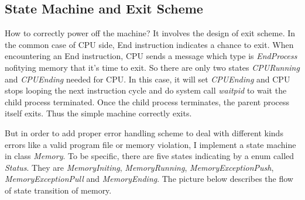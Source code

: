 \documentclass[a4paper]{report}
\begin{document}
\subsection*{State Machine and Exit Scheme}
How to correctly power off the machine? It involves the design of exit scheme. In the common case of CPU side, End instruction indicates a chance to exit. When encountering an End instruction, CPU sends a message which type is \textit{\color{blue} EndProcess} nofitying memory that it's time to exit. So there are only two states \textit{\color{blue} CPURunning} and \textit{\color{blue} CPUEnding} needed for CPU. In this case, it will set \textit{\color{blue} CPUEnding} and CPU stops looping the next instruction cycle and do system call \textit{\color{blue} waitpid} to wait the child process terminated. Once the child process terminates, the parent process itself exits. Thus the simple machine correctly exits.

But in order to add proper error handling scheme to deal with different kinds errors like a valid program file or memory violation, I implement a state machine in class \textit{\color{blue} Memory}. To be specific, there are five states indicating by a enum called \textit{\color{blue} Status}. They are \textit{\color{blue} MemoryIniting}, \textit{\color{blue} MemoryRunning}, \textit{\color{blue} MemoryExceptionPush}, \textit{\color{blue} MemoryExceptionPull} and \textit{\color{blue} MemoryEnding}. The picture below describes the flow of state transition of memory.

\end{document}
